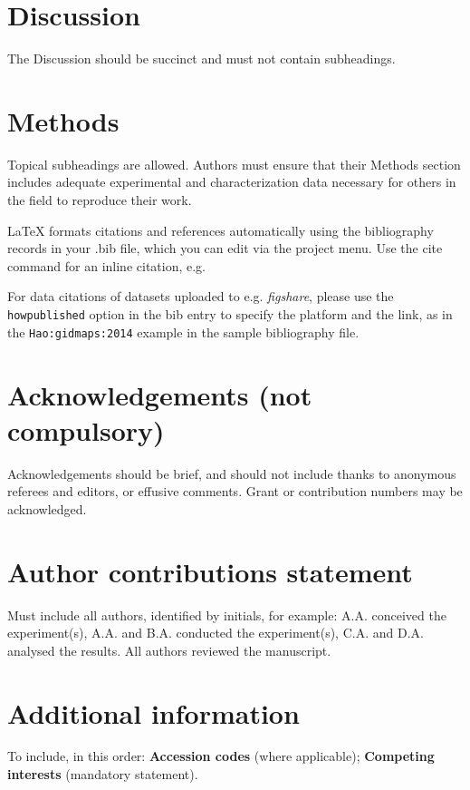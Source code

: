 \documentclass[fleqn,10pt]{wlscirep}
\begin{document}
\section*{Discussion}

The Discussion should be succinct and must not contain subheadings.

\section*{Methods}

Topical subheadings are allowed. Authors must ensure that their Methods section includes adequate experimental and characterization data necessary for others in the field to reproduce their work.



\noindent LaTeX formats citations and references automatically using the bibliography records in your .bib file, which you can edit via the project menu. Use the cite command for an inline citation, e.g. 

For data citations of datasets uploaded to e.g. \emph{figshare}, please use the \verb|howpublished| option in the bib entry to specify the platform and the link, as in the \verb|Hao:gidmaps:2014| example in the sample bibliography file.

\section*{Acknowledgements (not compulsory)}

Acknowledgements should be brief, and should not include thanks to anonymous referees and editors, or effusive comments. Grant or contribution numbers may be acknowledged.

\section*{Author contributions statement}

Must include all authors, identified by initials, for example:
A.A. conceived the experiment(s),  A.A. and B.A. conducted the experiment(s), C.A. and D.A. analysed the results.  All authors reviewed the manuscript. 

\section*{Additional information}

To include, in this order: \textbf{Accession codes} (where applicable); \textbf{Competing interests} (mandatory statement). 
\end{document}
